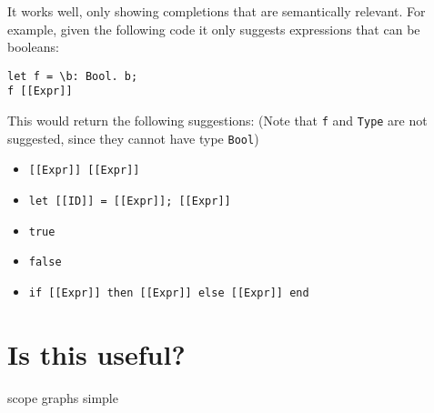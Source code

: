 It works well, only showing completions that are semantically relevant. For example, given the following code it only suggests expressions that can be booleans:
\begin{lstlisting}
let f = \b: Bool. b;
f [[Expr]]
\end{lstlisting}
This would return the following suggestions: (Note that \verb|f| and \verb|Type| are not suggested, since they cannot have type \verb|Bool|)
 \begin{itemize}
 	\item \verb|[[Expr]] [[Expr]]|
 	\item \verb|let [[ID]] = [[Expr]]; [[Expr]]|
 	\item \verb|true|
 	\item \verb|false|
 	\item \verb|if [[Expr]] then [[Expr]] else [[Expr]] end|
 \end{itemize}

\section{Is this useful?}
\todo{}
scope graphs simple